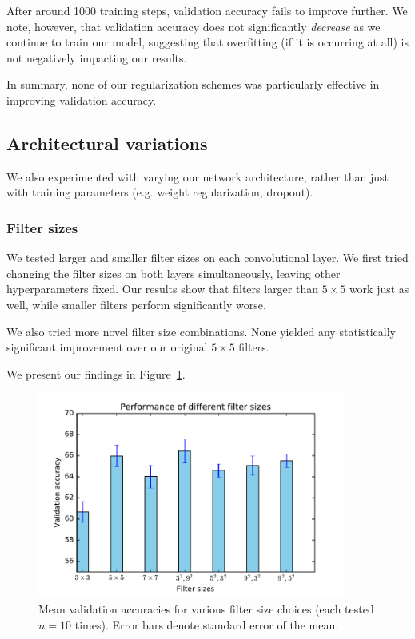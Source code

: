 \documentclass{article}
\begin{document}
\begin{multicols}{2}
After around 1000 training steps,
validation accuracy fails to improve further.
We note, however, that validation accuracy
does not significantly \emph{decrease}
as we continue to train our model,
suggesting that overfitting (if it is occurring at all)
is not negatively impacting our results.

In summary, none of our regularization schemes
was particularly effective in improving validation accuracy.



\subsection{Architectural variations}

We also experimented with varying our network architecture,
rather than just with training parameters
(e.g. weight regularization, dropout).


\subsubsection{Filter sizes}

We tested larger and smaller filter sizes
on each convolutional layer.
We first tried changing the filter sizes on both layers simultaneously,
leaving other hyperparameters fixed.
Our results show that filters larger than $5\times 5$
work just as well,
while smaller filters perform significantly worse.

We also tried more novel filter size combinations.
None yielded any statistically significant improvement
over our original $5\times 5$ filters.

We present our findings
in Figure~\ref{fig:filter-size-experiment}.

\begin{figure}[t]
   \centering
   \includegraphics[width=4in]{img/2-5-filter-size-acc.pdf} 
   \caption{Mean validation accuracies for various filter size choices (each tested $n=10$ times). Error bars denote standard error of the mean.}
   \label{fig:filter-size-experiment}
\end{figure}


\end{multicols}
\end{document}
